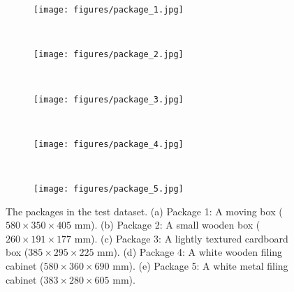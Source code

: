 \begin{figure}
	\centering
	\begin{subfigure}[b]{0.3\textwidth}
		\texttt{[image: figures/package\_1.jpg]}
		\caption{}
		\label{fig:package_1}
	\end{subfigure}%
	~~~ %
	\begin{subfigure}[b]{0.3\textwidth}
		\texttt{[image: figures/package\_2.jpg]}
		\caption{}
		\label{fig:package_2}
	\end{subfigure}
	\vspace{3mm}\\
	\begin{subfigure}[b]{0.3\textwidth}
		\texttt{[image: figures/package\_3.jpg]}
		\caption{}
		\label{fig:package_3}
	\end{subfigure}
	~~~
	\begin{subfigure}[b]{0.3\textwidth}
		\texttt{[image: figures/package\_4.jpg]}
		\caption{}
		\label{fig:package_4}
	\end{subfigure}
	\vspace{3mm}\\
	\begin{subfigure}[b]{0.3\textwidth}
		\texttt{[image: figures/package\_5.jpg]}
		\caption{}
		\label{fig:package_5}
	\end{subfigure}
	\caption[The packages in the test dataset]{The packages in the test dataset. (a) Package 1: A moving box ($580 \times 350 \times 405$ mm). (b) Package 2: A small wooden box ($260 \times 191 \times 177$ mm). (c) Package 3: A lightly textured cardboard box ($385 \times 295 \times 225$ mm). (d) Package 4: A white wooden filing cabinet ($580 \times 360 \times 690$ mm). (e) Package 5: A white metal filing cabinet ($383 \times 280 \times 605$ mm).}\label{fig:packages}
\end{figure}